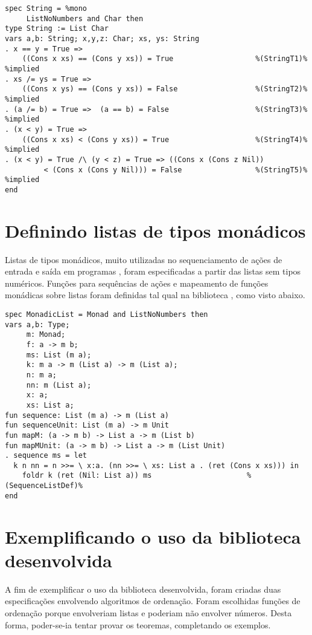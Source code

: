 \begin{Verbatim}
spec String = %mono
     ListNoNumbers and Char then
type String := List Char
vars a,b: String; x,y,z: Char; xs, ys: String
. x == y = True =>
 	((Cons x xs) == (Cons y xs)) = True                   %(StringT1)% %implied
. xs /= ys = True => 
	((Cons x ys) == (Cons y xs)) = False                  %(StringT2)% %implied
. (a /= b) = True =>  (a == b) = False                    %(StringT3)% %implied
. (x < y) = True => 
	((Cons x xs) < (Cons y xs)) = True                    %(StringT4)% %implied
. (x < y) = True /\ (y < z) = True => ((Cons x (Cons z Nil)) 
         < (Cons x (Cons y Nil))) = False                 %(StringT5)% %implied
end
\end{Verbatim}

\section{Definindo listas de tipos monádicos}
Listas de tipos monádicos, muito utilizadas no sequenciamento de ações de entrada e saída em programas \Haskell, foram especificadas a partir das listas sem tipos numéricos.
Funções para sequências de ações e mapeamento de funções monádicas sobre listas foram definidas tal qual na biblioteca \Prelude, como visto abaixo.

\begin{Verbatim}
spec MonadicList = Monad and ListNoNumbers then
vars a,b: Type;
     m: Monad;
     f: a -> m b;
     ms: List (m a);
     k: m a -> m (List a) -> m (List a);
     n: m a;
     nn: m (List a);
     x: a;
     xs: List a;
fun sequence: List (m a) -> m (List a)
fun sequenceUnit: List (m a) -> m Unit
fun mapM: (a -> m b) -> List a -> m (List b)
fun mapMUnit: (a -> m b) -> List a -> m (List Unit)
. sequence ms = let
  k n nn = n >>= \ x:a. (nn >>= \ xs: List a . (ret (Cons x xs))) in
    foldr k (ret (Nil: List a)) ms                      %(SequenceListDef)%
end
\end{Verbatim}

\section{Exemplificando o uso da biblioteca desenvolvida}
A fim de exemplificar o uso da biblioteca desenvolvida, foram criadas duas especificações envolvendo algoritmos de ordenação.
Foram escolhidas funções de ordenação porque envolveriam listas e poderiam não envolver números.
Desta forma, poder-se-ia tentar provar os teoremas, completando os exemplos.

